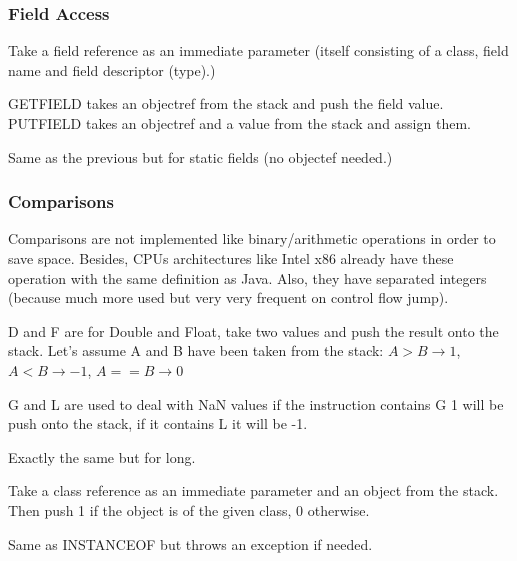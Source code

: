 \subsubsection{Field Access}
\theoremstyle{definition}
\begin{definition}
    Take a field reference as an immediate parameter (itself consisting of a
    class, field name and field descriptor (type).)

    GETFIELD takes an objectref from the stack and push the field value.
    PUTFIELD takes an objectref and a value from the stack and assign them.
\end{definition}
\theoremstyle{definition}
\begin{definition}
    Same as the previous but for static fields (no objectef needed.)
\end{definition}

\subsubsection{Comparisons}
Comparisons are not implemented like binary/arithmetic operations in order to
save space. Besides, CPUs architectures like Intel x86 already have these
operation with the same definition as Java. Also, they have separated integers
(because much more used but very very frequent on control flow jump).
\theoremstyle{definition}
\begin{definition}[(D/F)CMP(G/L)]
    D and F are for Double and Float, take two values and push the result onto
    the stack. Let's assume A and B have been taken from the stack: $A>B
    \rightarrow 1$, $A<B \rightarrow -1$, $A==B \rightarrow 0$

    G and L are used to deal with NaN values if the instruction contains G 1
    will be push onto the stack, if it contains L it will be -1.
\end{definition}
\theoremstyle{definition}
\begin{definition}[LCMP]
    Exactly the same but for long.
\end{definition}
\theoremstyle{definition}
\begin{definition}[INSTANCEOF]
    Take a class reference as an immediate parameter and an object from the
    stack. Then push 1 if the object is of the given class, 0 otherwise.
\end{definition}
\theoremstyle{definition}
\begin{definition}[CHECKCAST]
    Same as INSTANCEOF but throws an exception if needed.
\end{definition}

